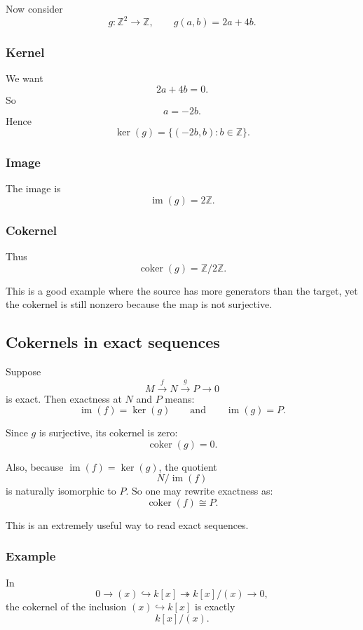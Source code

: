 \documentclass[12pt,a4paper]{article}
\theoremstyle{notespace}
\theoremstyle{definition}
\begin{document}
Now consider
\[
g:\mathbb Z^2\longrightarrow \mathbb Z,
\qquad
g(a,b)=2a+4b.
\]

\subsubsection*{Kernel}

We want
\[
2a+4b=0.
\]
So
\[
a=-2b.
\]
Hence
\[
\ker(g)=\{(-2b,b):b\in\mathbb Z\}.
\]

\subsubsection*{Image}

The image is
\[
\operatorname{im}(g)=2\mathbb Z.
\]

\subsubsection*{Cokernel}

Thus
\[
\operatorname{coker}(g)=\mathbb Z/2\mathbb Z.
\]

This is a good example where the source has more generators than the target, yet the cokernel is still nonzero because the map is not surjective.

\subsection{ Cokernels in exact sequences}

Suppose
\[
M\xrightarrow{f}N\xrightarrow{g}P\to 0
\]
is exact.
Then exactness at \(N\) and \(P\) means:
\[
\operatorname{im}(f)=\ker(g)
\qquad\text{and}\qquad
\operatorname{im}(g)=P.
\]

Since \(g\) is surjective, its cokernel is zero:
\[
\operatorname{coker}(g)=0.
\]

Also, because \(\operatorname{im}(f)=\ker(g)\), the quotient
\[
N/\operatorname{im}(f)
\]
is naturally isomorphic to \(P\).
So one may rewrite exactness as:
\[
\operatorname{coker}(f)\cong P.
\]

This is an extremely useful way to read exact sequences.

\subsubsection*{Example}

In
\[
0\to (x)\hookrightarrow k[x]\twoheadrightarrow k[x]/(x)\to 0,
\]
the cokernel of the inclusion \((x)\hookrightarrow k[x]\) is exactly
\[
k[x]/(x).
\]
\end{document}
